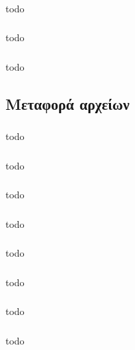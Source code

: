 \documentclass[a4paper, 12pt]{article}
\begin{document}
		\subsubsection{}
			todo

		\subsubsection{}
			todo

		\subsubsection{}
			todo

	\subsection{Μεταφορά αρχείων}

		\subsubsection{}
			todo

		\subsubsection{}
			todo

		\subsubsection{}
			todo

		\subsubsection{}
			todo

		\subsubsection{}
			todo

		\subsubsection{}
			todo

		\subsubsection{}
			todo

		\subsubsection{}
			todo
\end{document}
